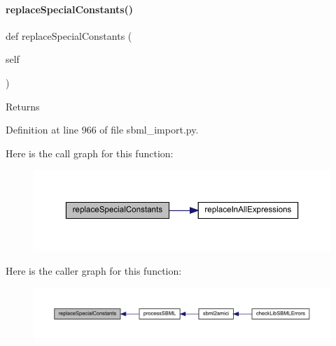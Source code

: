\paragraph{\texorpdfstring{replace\+Special\+Constants()}{replaceSpecialConstants()}}
{\footnotesize\ttfamily def replace\+Special\+Constants (\begin{DoxyParamCaption}\item[{}]{self }\end{DoxyParamCaption})}

\begin{DoxyReturn}{Returns}

\end{DoxyReturn}


Definition at line 966 of file sbml\+\_\+import.\+py.

Here is the call graph for this function\+:
\nopagebreak
\begin{figure}[H]
\begin{center}
\leavevmode
\includegraphics[width=350pt]{classamici_1_1sbml__import_1_1_sbml_importer_a5348e7b5041334f8c54b45c5c928dea0_cgraph}
\end{center}
\end{figure}
Here is the caller graph for this function\+:
\nopagebreak
\begin{figure}[H]
\begin{center}
\leavevmode
\includegraphics[width=350pt]{classamici_1_1sbml__import_1_1_sbml_importer_a5348e7b5041334f8c54b45c5c928dea0_icgraph}
\end{center}
\end{figure}
